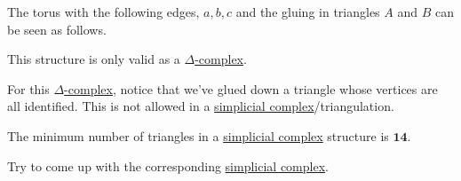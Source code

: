 \begin{eg}
	The torus with the following edges, \(a, b, c\) and the gluing in triangles \(A\) and \(B\) can be seen as follows.
	\begin{figure}[H]
		\centering
		\label{fig:eg:constructing-torus-simplicial}
	\end{figure}
	This structure is only valid as a \hyperref[def:delta-complex]{\(\Delta\)-complex}.
\end{eg}
\begin{explanation}
	For this \hyperref[def:delta-complex]{\(\Delta \)-complex}, notice that we've glued down a triangle whose vertices are all
	identified. This is not allowed in a \hyperref[def:simplicial-complex]{simplicial complex}/triangulation.

	\begin{remark}
		The minimum number of triangles in a \hyperref[def:simplicial-complex]{simplicial complex} structure is \(\bm{14}\).
		\begin{exercise}
			Try to come up with the corresponding \hyperref[def:simplicial-complex]{simplicial complex}.
		\end{exercise}
	\end{remark}
\end{explanation}
